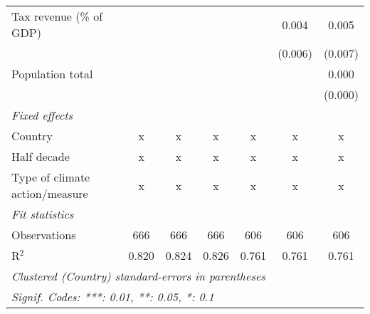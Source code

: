 \begin{tabular}{lcccccc}
   Tax revenue (\% of GDP)                                 &               &                &               &               & 0.004         & 0.005\\   
                                                           &               &                &               &               & (0.006)       & (0.007)\\   
   Population total                                        &               &                &               &               &               & 0.000\\   
                                                           &               &                &               &               &               & (0.000)\\   
   \emph{Fixed effects}\\
   Country                                                 & x             & x              & x             & x             & x             & x\\  
   Half decade                                             & x             & x              & x             & x             & x             & x\\  
   Type of climate action/measure                          & x             & x              & x             & x             & x             & x\\  
   \midrule \emph{Fit statistics}\\
   Observations                                            & 666           & 666            & 666           & 606           & 606           & 606\\  
   R$^2$                                                   & 0.820         & 0.824          & 0.826         & 0.761         & 0.761         & 0.761\\  
   \midrule
   \multicolumn{7}{l}{\emph{Clustered (Country) standard-errors in parentheses}}\\
   \multicolumn{7}{l}{\emph{Signif. Codes: ***: 0.01, **: 0.05, *: 0.1}}\\
\end{tabular}
\par\endgroup


